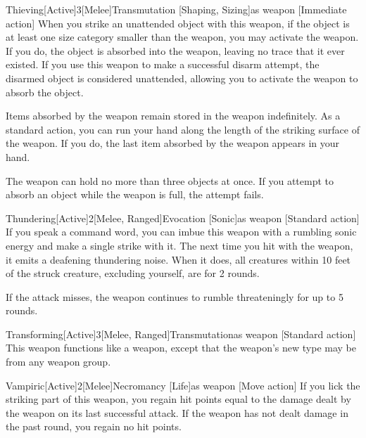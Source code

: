         \begin{magicitemdef}{Thieving}[Active]{3}[Melee]{Transmutation [Shaping, Sizing]}{as weapon}
            [Immediate action] When you strike an unattended object with this weapon, if the object is at least one size category smaller than the weapon, you may activate the weapon.
            If you do, the object is absorbed into the weapon, leaving no trace that it ever existed.
            If you use this weapon to make a successful disarm attempt, the disarmed object is considered unattended, allowing you to activate the weapon to absorb the object.

             Items absorbed by the weapon remain stored in the weapon indefinitely.
            As a standard action, you can run your hand along the length of the striking surface of the weapon.
            If you do, the last item absorbed by the weapon appears in your hand.

            The weapon can hold no more than three objects at once.
            If you attempt to absorb an object while the weapon is full, the attempt fails.
        \end{magicitemdef}

        \begin{magicitemdef}{Thundering}[Active]{2}[Melee, Ranged]{Evocation [Sonic]}{as weapon}
            [Standard action] If you speak a command word, you can imbue this weapon with a rumbling sonic energy and make a single strike with it.
            The next time you hit with the weapon, it emits a deafening thundering noise.
            When it does, all creatures within 10 feet of the struck creature, excluding yourself, are \deafened for 2 rounds.

            If the attack misses, the weapon continues to rumble threateningly for up to 5 rounds.
        \end{magicitemdef}

        \begin{magicitemdef}{Transforming}[Active]{3}[Melee, Ranged]{Transmutation}{as weapon}
            [Standard action] This weapon functions like a  weapon, except that the weapon's new type may be from any weapon group.
        \end{magicitemdef}

        \begin{magicitemdef}{Vampiric}[Active]{2}[Melee]{Necromancy [Life]}{as weapon}
            [Move action] If you lick the striking part of this weapon, you regain hit points equal to the damage dealt by the weapon on its last successful attack.
            If the weapon has not dealt damage in the past round, you regain no hit points.
        \end{magicitemdef}

